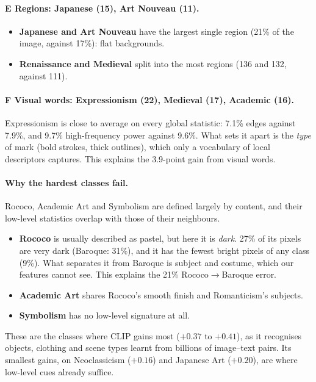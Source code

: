 \documentclass[10pt,twocolumn,a4paper]{article}
\begin{document}
\paragraph{E Regions: Japanese (15), Art Nouveau (11).}
\begin{itemize}
\item \textbf{Japanese and Art Nouveau} have the largest single region (21\% of the image, against 17\%): flat backgrounds.
\item \textbf{Renaissance and Medieval} split into the most regions (136 and 132, against 111).
\end{itemize}

\paragraph{F Visual words: Expressionism (22), Medieval (17), Academic (16).}
Expressionism is close to average on every global statistic: 7.1\% edges against 7.9\%, and 9.7\% high-frequency power against 9.6\%. What sets it apart is the \emph{type} of mark (bold strokes, thick outlines), which only a vocabulary of local descriptors captures. This explains the 3.9-point gain from visual words.

\paragraph{Why the hardest classes fail.}
Rococo, Academic Art and Symbolism are defined largely by content, and their low-level statistics overlap with those of their neighbours.
\begin{itemize}
\item \textbf{Rococo} is usually described as pastel, but here it is \emph{dark}. 27\% of its pixels are very dark (Baroque: 31\%), and it has the fewest bright pixels of any class (9\%). What separates it from Baroque is subject and costume, which our features cannot see. This explains the 21\% Rococo$\rightarrow$Baroque error.
\item \textbf{Academic Art} shares Rococo's smooth finish and Romanticism's subjects.
\item \textbf{Symbolism} has no low-level signature at all.
\end{itemize}
These are the classes where CLIP gains most ($+0.37$ to $+0.41$), as it recognises objects, clothing and scene types learnt from billions of image--text pairs. Its smallest gains, on Neoclassicism ($+0.16$) and Japanese Art ($+0.20$), are where low-level cues already suffice.
\end{document}
